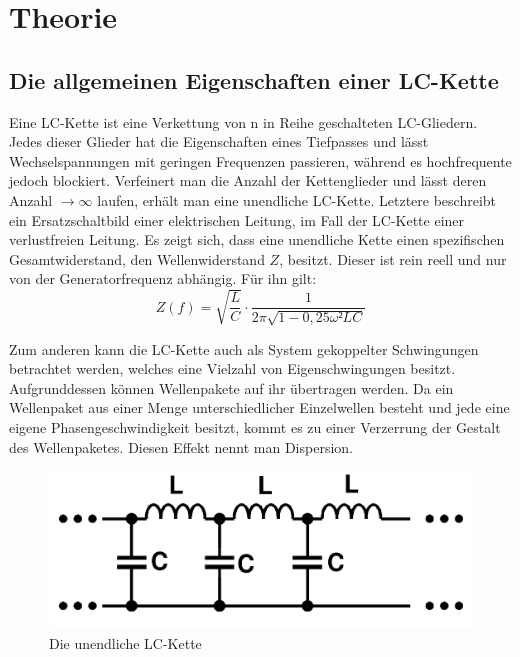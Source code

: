
\section{Theorie}
\label{sec:Theorie}

\subsection{Die allgemeinen Eigenschaften einer LC-Kette}
Eine LC-Kette ist eine Verkettung von n in Reihe geschalteten LC-Gliedern.
 Jedes dieser Glieder hat die Eigenschaften eines Tiefpasses und lässt
  Wechselspannungen mit geringen Frequenzen passieren, während es hochfrequente jedoch
   blockiert. Verfeinert man die Anzahl der Kettenglieder und lässt
   deren Anzahl $\to \infty$ laufen, erhält man eine unendliche LC-Kette. Letztere
    beschreibt ein Ersatzschaltbild einer elektrischen Leitung, im Fall der
     LC-Kette einer verlustfreien Leitung. Es zeigt sich, dass eine unendliche
      Kette einen spezifischen Gesamtwiderstand, den Wellenwiderstand $Z$, besitzt.
      Dieser ist rein reell und nur von der Generatorfrequenz abhängig. Für ihn gilt:
      \begin{equation}
        Z(f) = \sqrt{\frac{L}{C}} \cdot \frac{1}{2\pi \sqrt{1-0,25\omega² LC}}
      \end{equation}

 Zum anderen kann die LC-Kette auch als System gekoppelter
    Schwingungen betrachtet werden, welches eine Vielzahl von Eigenschwingungen besitzt.
      Aufgrunddessen können Wellenpakete auf ihr übertragen werden.
     Da ein Wellenpaket aus einer Menge unterschiedlicher Einzelwellen besteht
      und jede eine eigene Phasengeschwindigkeit besitzt, kommt es zu einer Verzerrung
  der Gestalt des Wellenpaketes. Diesen Effekt nennt man Dispersion.


     \begin{figure}[H]
       \centering
       \includegraphics[width=\linewidth-200pt,height=\textheight-200pt,keepaspectratio]{content/Grafiken/LCKette.png}
       \caption{Die unendliche LC-Kette}
       \label{fig:LC-Kette}
     \end{figure}

